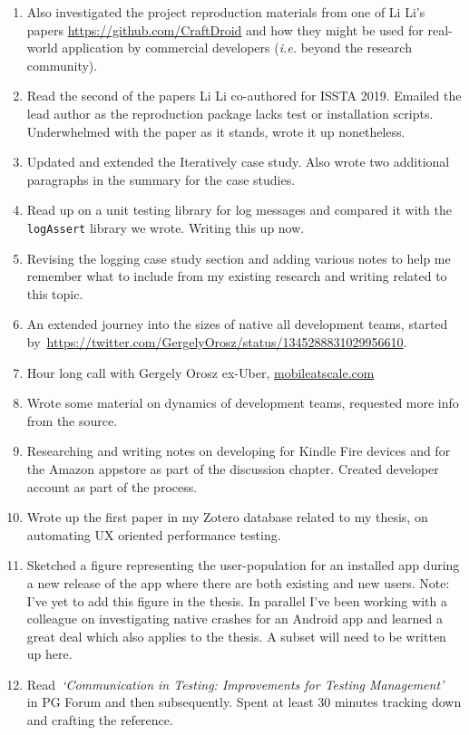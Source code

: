 \begin{enumerate}
    \item Also investigated the project reproduction materials from one of Li Li's papers \url{https://github.com/CraftDroid} and how they might be used for real-world application by commercial developers (\textit{i.e.} beyond the research community).
    \item Read the second of the papers Li Li co-authored for ISSTA 2019. Emailed the lead author as the reproduction package lacks test or installation scripts. Underwhelmed with the paper as it stands, wrote it up nonetheless.
    \item Updated and extended the Iteratively case study. Also wrote two additional paragraphs in the summary for the case studies.
    \item Read up on a unit testing library for log messages and compared it with the \texttt{logAssert} library we wrote. Writing this up now.
    \item Revising the logging case study section and adding various notes to help me remember what to include from my existing research and writing related to this topic.
    \item An extended journey into the sizes of native all development teams, started by~\url{https://twitter.com/GergelyOrosz/status/1345288831029956610}.
    \item Hour long call with Gergely Orosz ex-Uber, \href{https://www.mobileatscale.com/}{mobileatscale.com}
    \item Wrote some material on dynamics of development teams, requested more info from the source.
    \item Researching and writing notes on developing for Kindle Fire devices and for the Amazon appstore as part of the discussion chapter. Created developer account as part of the process.
    \item Wrote up the first paper in my Zotero database related to my thesis, on automating UX oriented performance testing.
    \item Sketched a figure representing the user-population for an installed app during a new release of the app where there are both existing and new users. Note: I've yet to add this figure in the thesis. In parallel I've been working with a colleague on investigating native crashes for an Android app and learned a great deal which also applies to the thesis. A subset will need to be written up here.
    \item Read~\emph{`Communication in Testing: Improvements for Testing Management'}~\citep{paakkonen2009_communication_in_testing} in PG Forum and then subsequently. Spent at least 30 minutes tracking down and crafting the reference.

\end{enumerate}
